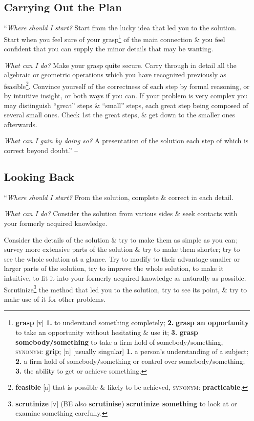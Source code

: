 \documentclass[oneside]{book}
\numberwithin{equation}{section}
\begin{document}
\subsection{Carrying Out the Plan}
``\textit{Where should I start?} Start from the lucky idea that led you to the solution. Start when you feel sure of your grasp\footnote{\textbf{grasp} [v] \textbf{1.} to understand something completely; \textbf{2.} \textbf{grasp an opportunity} to take an opportunity without hesitating \& use it; \textbf{3.} \textbf{grasp somebody\texttt{/}something} to take a firm hold of somebody\texttt{/}something, \textsc{synonym}: \textbf{grip}; [n] [usually singular] \textbf{1.} a person's understanding of a subject; \textbf{2.} a firm hold of somebody\texttt{/}something or control over somebody\texttt{/}something; \textbf{3.} the ability to get or achieve something.} of the main connection \& you feel confident that you can supply the minor details that may be wanting.

\textit{What can I do?} Make your grasp quite secure. Carry through in detail all the algebraic or geometric operations which you have recognized previously as feasible\footnote{\textbf{feasible} [a] that is possible \& likely to be achieved, \textsc{synonym}: \textbf{practicable}.}. Convince yourself of the correctness of each step by formal reasoning, or by intuitive insight, or both ways if you can. If your problem is very complex you may distinguish ``great'' steps \& ``small'' steps, each great step being composed of several small ones. Check 1st the great steps, \& get down to the smaller ones afterwards.

\textit{What can I gain by doing so?} A presentation of the solution each step of which is correct beyond doubt.'' -- \cite[pp. 33--35]{Polya2014}

\subsection{Looking Back}
``\textit{Where should I start?} From the solution, complete \& correct in each detail.

\textit{What can I do?} Consider the solution from various sides \& seek contacts with your formerly acquired knowledge.

Consider the details of the solution \& try to make them as simple as you can; survey more extensive parts of the solution \& try to make them shorter; try to see the whole solution at a glance. Try to modify to their advantage smaller or larger parts of the solution, try to improve the whole solution, to make it intuitive, to fit it into your formerly acquired knowledge as naturally as possible. Scrutinize\footnote{\textbf{scrutinize} [v] (BE also \textbf{scrutinise}) \textbf{scrutinize something} to look at or examine something carefully.} the method that led you to the solution, try to see its point, \& try to make use of it for other problems.
\end{document}
